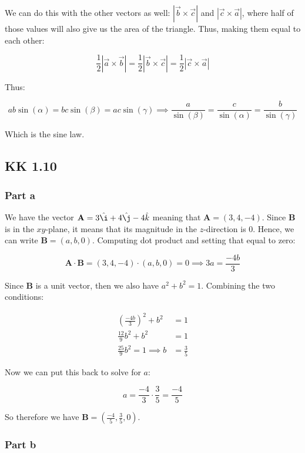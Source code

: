 \documentclass{article}
\theoremstyle{definition}
\numberwithin{equation}{section}
\numberwithin{definition}{section}
\begin{document}
\medskip

We can do this with the other vectors as well: $|\vec{b} \times \vec{c}|$ and $|\vec{c} \times \vec{a}|$, where half of those values will also give us the area of the triangle. Thus, making them equal to each other:

\[\frac{1}{2} |\vec{a} \times \vec{b}| = \frac{1}{2}|\vec{b} \times \vec{c}| = \frac{1}{2}	|\vec{c} \times \vec{a}|\]

Thus: 

	\[ab \sin(\alpha) = bc \sin(\beta) = ac \sin(\gamma) \implies \frac{a}{\sin(\beta)} = \frac{c}{\sin(\alpha)} = \frac{b}{\sin(\gamma)}\]


Which is the sine law.
\subsection{KK 1.10}

\subsubsection{Part a}
We have the vector $\mathbf{A} = 3 \hat \i + 4 \hat \j - 4 \hat k$ meaning that $\mathbf{A} = (3, 4, -4)$. Since $\mathbf{B}$ is in the $xy$-plane, it means that its magnitude in the $z$-direction is 0. Hence, we can write $\mathbf{B} = (a, b, 0)$. Computing dot product and setting that equal to zero:

\[ \mathbf{A} \cdot \mathbf{B} = (3, 4, -4) \cdot (a, b, 0) = 0 \implies 3a =\frac{-4b}{3}\]

Since $\mathbf{B}$ is a unit vector, then we also have $a^2 + b^2 = 1$. Combining the two conditions:

\begin{align*}
		\left(\frac{-4b}{3}\right)^2 + b^2 &= 1\\
		\frac{12}{9} b^2 + b^2 &= 1\\ 
		\frac{25}{9}b^2 = 1 \implies b &= \frac{3}{5}
\end{align*} 

Now we can put this back to solve for $a$: 

\[ a = \frac{-4}{3} \cdot \frac{3}{5} = \frac{-4}{5}\]

So therefore we have $\mathbf{B} = (\frac{-4}{5}, \frac{3}{5}, 0)$. 

\subsubsection{Part b}
\end{document}
